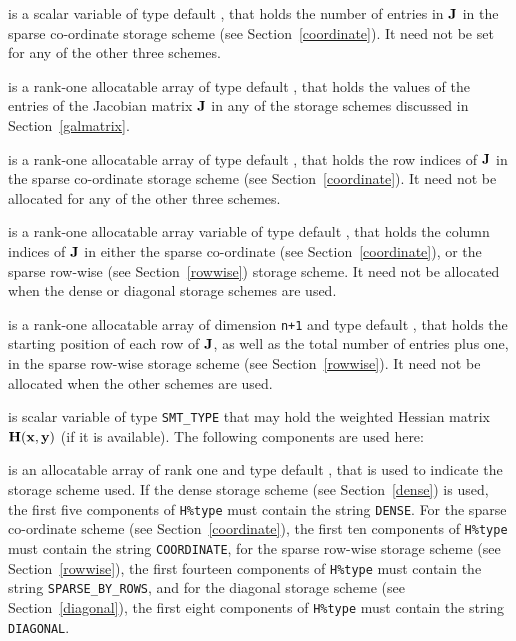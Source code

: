 \documentclass{galahad}
\begin{document}
\begin{description}
\begin{description}
 is a scalar variable of type default \integer, that
holds the number of entries in ${\mathbf{J}}$
in the sparse co-ordinate storage scheme (see Section~\ref{coordinate}).
It need not be set for any of the other three schemes.

 is a rank-one allocatable array of type default \realdp, that holds
the values of the entries of the Jacobian matrix ${\mathbf{J}}$ in any of the
storage schemes discussed in Section~\ref{galmatrix}.

 is a rank-one allocatable array of type default \integer,
that holds the row indices of ${\mathbf{J}}$ in the sparse co-ordinate storage
scheme (see Section~\ref{coordinate}).
It need not be allocated for any of the other three schemes.

 is a rank-one allocatable array variable of type default \integer,
that holds the column indices of ${\mathbf{J}}$ in either the sparse co-ordinate
(see Section~\ref{coordinate}), or the sparse row-wise
(see Section~\ref{rowwise}) storage scheme.
It need not be allocated when the dense or diagonal storage schemes are used.

 is a rank-one allocatable array of dimension {\tt n+1} and type
default \integer, that holds the starting position of
each row of ${\mathbf{J}}$, as well
as the total number of entries plus one, in the sparse row-wise storage
scheme (see Section~\ref{rowwise}). It need not be allocated when the
other schemes are used.

\end{description}

 is scalar variable of type {\tt SMT\_TYPE} that may hold the
weighted Hessian matrix ${\mathbf{H}}({\mathbf{x}},{\mathbf{y}})$ (if it is available).
The following components are used here:

\begin{description}

 is an allocatable array of rank one and type default
\character, that
is used to indicate the storage scheme used. If the dense storage scheme
(see Section~\ref{dense}) is used,
the first five components of {\tt H\%type} must contain the
string {\tt DENSE}.
For the sparse co-ordinate scheme (see Section~\ref{coordinate}),
the first ten components of {\tt H\%type} must contain the
string {\tt COORDINATE},
for the sparse row-wise storage scheme (see Section~\ref{rowwise}),
the first fourteen components of {\tt H\%type} must contain the
string {\tt SPARSE\_BY\_ROWS},
and for the diagonal storage scheme (see Section~\ref{diagonal}),
the first eight components of {\tt H\%type} must contain the
string {\tt DIAGONAL}.


\end{description}
\end{description}
\end{document}
